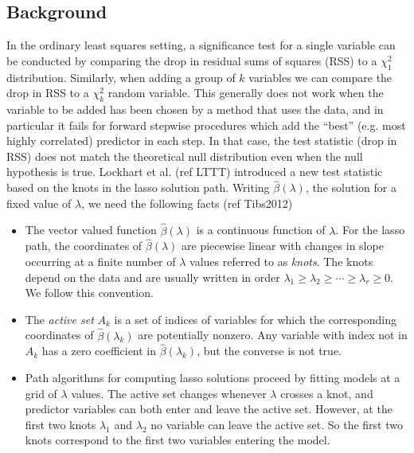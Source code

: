 \documentclass{imsart}
\begin{document}
\subsection{Background}
In the ordinary least squares setting, a significance test for a
single variable can be conducted by comparing the drop in residual
sums of squares (RSS) to a $\chi^2_1$ distribution. Similarly, when
adding a group of $k$ variables we can compare the drop in RSS to a
$\chi^2_k$ random variable. This generally does not work when the
variable to be added has been chosen by a method that uses the data,
and in particular it fails for forward stepwise procedures which add
the ``best'' (e.g. most highly correlated) predictor in each step. In
that case, the test statistic (drop in RSS) does not match the
theoretical null distribution even when the null hypothesis is
true. Lockhart et al. (ref LTTT) introduced a new test statistic based
on the knots in the lasso solution path. Writing $\hat
\beta(\lambda)$, the solution for a fixed value of $\lambda$, we need
the following facts (ref Tibs2012) 

\begin{itemize}

  \item The vector valued function $\hat \beta(\lambda)$ is a
    continuous function of $\lambda$. For the lasso path, the
    coordinates of $\hat \beta(\lambda)$ are piecewise linear with
    changes in slope occurring at a finite number of $\lambda$ values
    referred to as \emph{knots}. The knots depend on the data and are
    usually written in order $\lambda_1 \geq \lambda_2 \geq \cdots
    \geq \lambda_r \geq 0$. We follow this convention. 

  \item The \emph{active set} $A_k$ is a set of indices of variables
    for which the corresponding coordinates of $\hat \beta(\lambda_k)$
    are potentially nonzero. Any variable with index not in $A_k$ has
    a zero coefficient in $\hat \beta(\lambda_k)$, but the converse is
    not true. 
  
  \item Path algorithms for computing lasso solutions proceed by
    fitting models at a grid of $\lambda$ values. The active set
    changes whenever $\lambda$ crosses a knot, and predictor variables
    can both enter and leave the active set. However, at the first two
    knots $\lambda_1$ and $\lambda_2$ no variable can leave the active
    set. So the first two knots correspond to the first two variables
    entering the model. 

\end{itemize}
\end{document}
